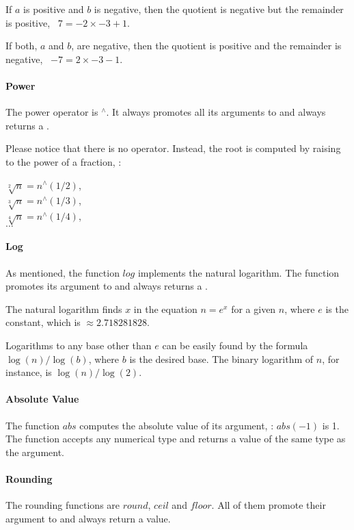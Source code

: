 If $a$ is positive and $b$ is negative, then
the quotient is negative but the remainder
is positive, \eg\
$7 = -2\times -3 + 1$.

If both, $a$ and $b$, are negative,
then the quotient is positive and 
the remainder is negative, \eg\
$-7 = 2\times -3 -1$.

\paragraph{Power}
The power operator is $^{\wedge}$.
It always promotes all its arguments to 
and always returns a \term{float}.

Please notice that there is no  operator.
Instead, the root is computed by raising to the power
of a fraction, \eg:

$\sqrt[2]{n} = n^{\wedge}{(1/2)}$,\\
$\sqrt[3]{n} = n^{\wedge}{(1/3)}$,\\
$\sqrt[4]{n} = n^{\wedge}{(1/4)}$,\\
$\dots$

\paragraph{Log}
As mentioned, the function $log$
implements the natural logarithm.
The function promotes its argument to 
and always returns a \term{float}.

The natural logarithm finds $x$ in the equation
$n=e^{x}$ for a given $n$, where $e$ is the
\term{Euler-Napier} constant, which is
$\approx 2.718281828$.

Logarithms to any base other than $e$
can be easily found by the formula
$\log(n)/\log(b)$, where $b$ is the
desired base. The binary logarithm
of $n$, for instance, is
$\log(n)/\log(2)$.

\paragraph{Absolute Value}
The function $abs$ computes the
absolute value of its argument, \eg:
$abs(-1)$ is 1.
The function accepts any numerical type
and returns a value of the same type as the argument.

\paragraph{Rounding}
The rounding functions are $round$, $ceil$ and $floor$.
All of them promote their argument to 
and always return a \term{float} value.


